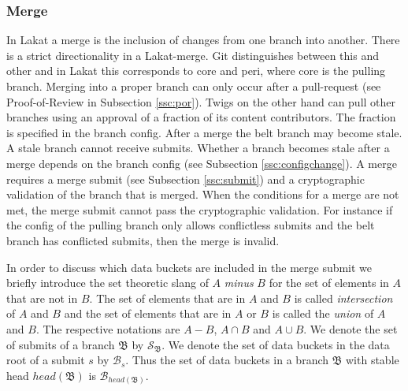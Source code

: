 \documentclass[14pt]{article}
\begin{document}
\subsubsection*{Merge}
In Lakat a merge is the inclusion of changes from one branch into another. There is a strict directionality in a Lakat-merge. Git distinguishes between this and other and in Lakat this corresponds to core and peri, where core is the pulling branch. Merging into a proper branch can only occur after a pull-request (see Proof-of-Review in Subsection \ref{ssc:por}). Twigs on the other hand can pull other branches using an approval of a fraction of its content contributors. The fraction is specified in the branch config. After a merge the belt branch may become stale. A stale branch cannot receive submits. Whether a branch becomes stale after a merge depends on the branch config (see Subsection \ref{ssc:configchange}).
A merge requires a merge submit (see Subsection \ref{ssc:submit}) and a cryptographic validation of the branch that is merged. When the conditions for a merge are not met, the merge submit cannot pass the cryptographic validation. For instance if the config of the pulling branch only allows conflictless submits and the belt branch has conflicted submits, then the merge is invalid.

In order to discuss which data buckets are included in the merge submit we briefly introduce the set theoretic slang of $A$ \textit{minus} $B$ for the set of elements in $A$ that are not in $B$. The set of elements that are in $A$ and $B$ is called \textit{intersection} of $A$ and $B$ and the set of elements that are in $A$ or $B$ is called the \textit{union} of $A$ and $B$. The respective notations are $A-B$, $A\cap B$ and $A\cup B$. We denote the set of submits of a branch $\mathfrak B$ by $\mathcal S_{\mathfrak B}$. We denote the set of data buckets in the data root of a submit $s$ by $\mathcal{B}_s$. Thus the set of data buckets in a branch $\mathfrak B$ with stable head $head(\mathfrak B)$ is $\mathcal{B}_{head(\mathfrak B)}$. 
\end{document}
